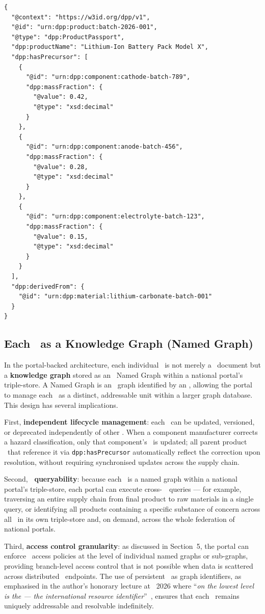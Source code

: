 \begin{lstlisting}[language=jsonld]
{
  "@context": "https://w3id.org/dpp/v1",
  "@id": "urn:dpp:product:batch-2026-001",
  "@type": "dpp:ProductPassport",
  "dpp:productName": "Lithium-Ion Battery Pack Model X",
  "dpp:hasPrecursor": [
    {
      "@id": "urn:dpp:component:cathode-batch-789",
      "dpp:massFraction": {
        "@value": 0.42,
        "@type": "xsd:decimal"
      }
    },
    {
      "@id": "urn:dpp:component:anode-batch-456",
      "dpp:massFraction": {
        "@value": 0.28,
        "@type": "xsd:decimal"
      }
    },
    {
      "@id": "urn:dpp:component:electrolyte-batch-123",
      "dpp:massFraction": {
        "@value": 0.15,
        "@type": "xsd:decimal"
      }
    }
  ],
  "dpp:derivedFrom": {
    "@id": "urn:dpp:material:lithium-carbonate-batch-001"
  }
}
\end{lstlisting}

\subsection{Each \DPP\ as a Knowledge Graph (Named Graph)}

In the portal-backed architecture, each individual \DPP\ is not merely a
\JSONLD\ document but a \textbf{knowledge graph} stored as an \RDF\ Named Graph
within a national portal's triple-store. A Named Graph is an \RDF\ graph identified by
an \IRI, allowing the portal to manage each \DPP\ as a distinct, addressable
unit within a larger graph database. This design has several implications.

First, \textbf{independent lifecycle management}: each \DPP\ can be updated,
versioned, or deprecated independently of other \DPPs. When a component
manufacturer corrects a hazard classification, only that component's \DPP\ is
updated; all parent product \DPPs\ that reference it via
\texttt{dpp:hasPrecursor} automatically reflect the correction upon resolution,
without requiring synchronised updates across the supply chain.

Second, \textbf{\SPARQL\ queryability}: because each \DPP\ is a named graph
within a national portal's triple-store, each portal can execute cross-\DPP\
\SPARQL\ queries --- for example, traversing an entire supply chain from final
product to raw materials in a single query, or identifying all products
containing a specific substance of concern across all \DPPs\ in its own
triple-store and, on demand, across the whole federation of national portals.

Third, \textbf{access control granularity}: as discussed in Section~5, the
portal can enforce \ODRL\ access policies at the level of individual named
graphs or sub-graphs, providing branch-level access control that is not possible
when data is scattered across distributed \REO\ endpoints. The use of persistent
\IRIs\ as graph identifiers, as emphasised in the author's honorary lecture at
\DPPforEU~2026 where ``\textit{on the lowest level is the \IRI --- the
international resource identifier}''~\cite{dpp4eu2026_day2}, ensures that each
\DPP\ remains uniquely addressable and resolvable indefinitely.

